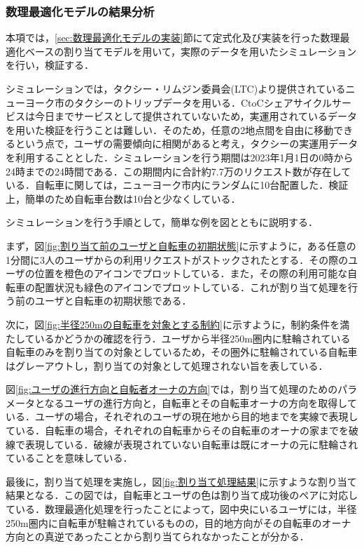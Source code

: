      \subsubsection{数理最適化モデルの結果分析}
        \label{sec:数理最適化モデルの結果分析}
          \par 本項では，\ref{sec:数理最適化モデルの実装}節にて定式化及び実装を行った数理最適化ベースの割り当てモデルを用いて，実際のデータを用いたシミュレーションを行い，検証する．
          \par シミュレーションでは，タクシー・リムジン委員会(LTC)より提供されているニューヨーク市のタクシーのトリップデータを用いる．CtoCシェアサイクルサービスは今日までサービスとして提供されていないため，実運用されているデータを用いた検証を行うことは難しい．そのため，任意の2地点間を自由に移動できるという点で，ユーザの需要傾向に相関があると考え，タクシーの実運用データを利用することとした．シミュレーションを行う期間は2023年1月1日の0時から24時までの24時間である．この期間内に合計約7.7万のリクエスト数が存在している．自転車に関しては，ニューヨーク市内にランダムに10台配置した．検証上，簡単のため自転車台数は10台と少なくしている．
          \par シミュレーションを行う手順として，簡単な例を図とともに説明する．
          \par まず，図\ref{fig:割り当て前のユーザと自転車の初期状態}に示すように，ある任意の1分間に3人のユーザからの利用リクエストがストックされたとする．その際のユーザの位置を橙色のアイコンでプロットしている．また，その際の利用可能な自転車の配置状況も緑色のアイコンでプロットしている．これが割り当て処理を行う前のユーザと自転車の初期状態である．
          \par 次に，図\ref{fig:半径250mの自転車を対象とする制約}に示すように，制約条件を満たしているかどうかの確認を行う．ユーザから半径250m圏内に駐輪されている自転車のみを割り当ての対象としているため，その圏外に駐輪されている自転車はグレーアウトし，割り当ての対象として処理されない旨を表している．
          \par 図\ref{fig:ユーザの進行方向と自転者オーナの方向}では，割り当て処理のためのパラメータとなるユーザの進行方向と，自転車とその自転車オーナの方向を取得している．ユーザの場合，それぞれのユーザの現在地から目的地までを実線で表現している．自転車の場合，それぞれの自転車からその自転車のオーナの家までを破線で表現している．破線が表現されていない自転車は既にオーナの元に駐輪されていることを意味している．
          \par 最後に，割り当て処理を実施し，図\ref{fig:割り当て処理結果}に示すような割り当て結果となる．この図では，自転車とユーザの色は割り当て成功後のペアに対応している．数理最適化処理を行ったことによって，図中央にいるユーザには，半径250m圏内に自転車が駐輪されているものの，目的地方向がその自転車のオーナ方向との真逆であったことから割り当てられなかったことが分かる．

